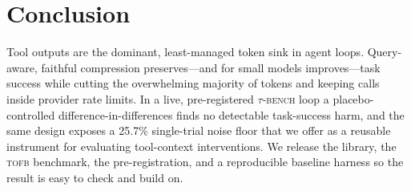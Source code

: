 \documentclass[11pt]{article}
\newcommand{\tofb}{\textsc{tofb}}
\begin{document}
\section{Conclusion}
Tool outputs are the dominant, least-managed token sink in agent loops.
Query-aware, faithful compression preserves---and for small models improves---task
success while cutting the overwhelming majority of tokens and keeping calls inside
provider rate limits. In a live, pre-registered \textsc{$\tau$-bench} loop a
placebo-controlled difference-in-differences finds no detectable task-success
harm, and the same design exposes a 25.7\% single-trial noise floor that we offer
as a reusable instrument for evaluating tool-context interventions. We release the
library, the \tofb{} benchmark, the pre-registration, and a reproducible baseline
harness so the result is easy to check and build on.



\end{document}
